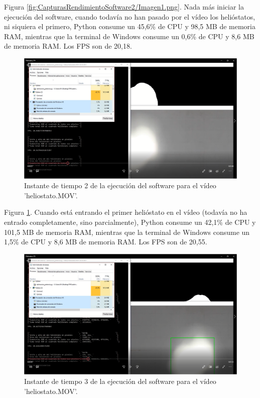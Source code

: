 Figura \ref{fig:CapturasRendimientoSoftware2/Imagen1.png}. Nada más iniciar la ejecución del software, cuando todavía no han pasado por el vídeo los helióstatos, ni siquiera el primero, Python consume un 45,6\% de CPU y 98,5 MB de memoria RAM, mientras que la terminal de Windows consume un 0,6\% de CPU y 8,6 MB de memoria RAM. Los FPS son de 20,18.\\[20pt]

\begin{figure}[h!]
  	\centering
	\includegraphics[width=\textwidth]{CapturasRendimientoSoftware2/Imagen2.png}
	\caption{Instante de tiempo 2 de la ejecución del software para el vídeo 'heliostato.MOV'.
	\label{fig:CapturasRendimientoSoftware2/Imagen2.png}}
\end{figure}

Figura \ref{fig:CapturasRendimientoSoftware2/Imagen2.png}. Cuando está entrando el primer helióstato en el vídeo (todavía no ha entrado completamente, sino parcialmente), Python consume un 42,1\% de CPU y 101,5 MB de memoria RAM, mientras que la terminal de Windows consume un 1,5\% de CPU y 8,6 MB de memoria RAM. Los FPS son de 20,55.\\[20pt]

\begin{figure}[h!]
  	\centering
	\includegraphics[width=\textwidth]{CapturasRendimientoSoftware2/Imagen3.png}
	\caption{Instante de tiempo 3 de la ejecución del software para el vídeo 'heliostato.MOV'.
	\label{fig:CapturasRendimientoSoftware2/Imagen3.png}}
\end{figure}


